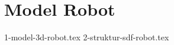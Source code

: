 \section{Model Robot}
\label{sec:modelrobot}

\textcolor{red}{\lipsum[1-2]}

{1-model-3d-robot.tex}
{2-struktur-sdf-robot.tex}
